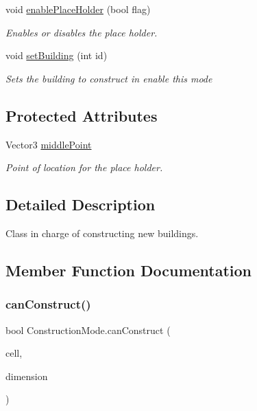 \begin{DoxyCompactItemize}
void \mbox{\hyperlink{class_construction_mode_a1bbac325b59030aeaae9a5ee5386f5a3}{enable\+Place\+Holder}} (bool flag)
\begin{DoxyCompactList}\small\item\em Enables or disables the place holder. \end{DoxyCompactList}\item 
void \mbox{\hyperlink{class_construction_mode_ad06e08c8ebf5e525d9ddf799cbf00c47}{set\+Building}} (int id)
\begin{DoxyCompactList}\small\item\em Sets the building to construct in enable this mode \end{DoxyCompactList}\end{DoxyCompactItemize}
\subsection*{Protected Attributes}
\begin{DoxyCompactItemize}
\item 
Vector3 \mbox{\hyperlink{class_construction_mode_ac1fd69c80b3e6a1561a6353e1c15997e}{middle\+Point}}
\begin{DoxyCompactList}\small\item\em Point of location for the place holder. \end{DoxyCompactList}\end{DoxyCompactItemize}


\subsection{Detailed Description}
Class in charge of constructing new buildings. 



\subsection{Member Function Documentation}
\mbox{\label{class_construction_mode_aaf154f26d7cca5d1b8fd7a4d246616c6}} 
\subsubsection{\texorpdfstring{can\+Construct()}{canConstruct()}}
{\footnotesize\ttfamily bool Construction\+Mode.\+can\+Construct (\begin{DoxyParamCaption}\item[{\mbox{\hyperlink{class_cell}{Cell}}}]{cell,  }\item[{Vector2\+Int}]{dimension }\end{DoxyParamCaption})}



